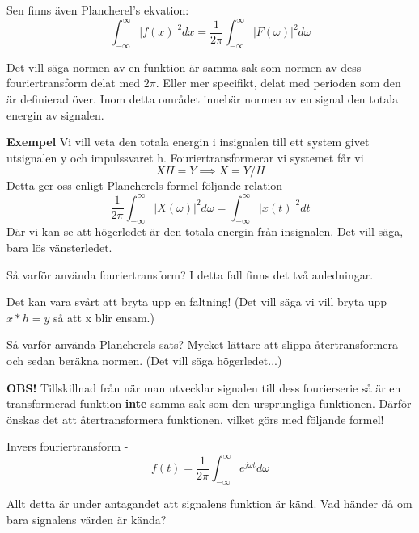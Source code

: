 \documentclass{article}
\begin{document}
Sen finns även Plancherel's ekvation: %
\[\int_{-\infty}^{\infty} |f(x)|^2 dx = \frac{1}{2 \pi}\int_{-\infty}^{\infty} |F(\omega)|^2 d\omega \] %

Det vill säga normen av en funktion är samma sak som normen av dess fouriertransform delat med $2 \pi$. Eller mer specifikt, delat med perioden som den är definierad över. Inom detta området innebär normen av en signal den totala energin av signalen. %

\textbf{Exempel}
Vi vill veta den totala energin i insignalen till ett system givet utsignalen y och impulssvaret h. Fouriertransformerar vi systemet får vi
\[XH = Y \implies X = Y/H\]
Detta ger oss enligt Plancherels formel följande relation
\[ \frac{1}{2 \pi} \int_{-\infty}^{\infty} |X(\omega)|^2 d \omega = \int_{-\infty}^{\infty} |x(t)|^2 d t \]
Där vi kan se att högerledet är den totala energin från insignalen.
Det vill säga, bara lös vänsterledet.

Så varför använda fouriertransform? I detta fall finns det två anledningar. %

Det kan vara svårt att bryta upp en faltning! (Det vill säga vi vill bryta upp $x*h=y$ så att x blir ensam.)

Så varför använda Plancherels sats? Mycket lättare att slippa återtransformera och sedan beräkna normen. (Det vill säga högerledet...)

\textbf{OBS!} Tillskillnad från när man utvecklar signalen till dess fourierserie så är en transformerad funktion \textbf{inte} samma sak som den ursprungliga funktionen. Därför önskas det att återtransformera funktionen, vilket görs med följande formel!

Invers fouriertransform -
\[f(t) = \frac{1}{2 \pi} \int_{-\infty}^{\infty}  e^{j \omega t} d\omega \]

Allt detta är under antagandet att signalens funktion är känd. Vad händer då om bara signalens värden är kända?

\end{document}
